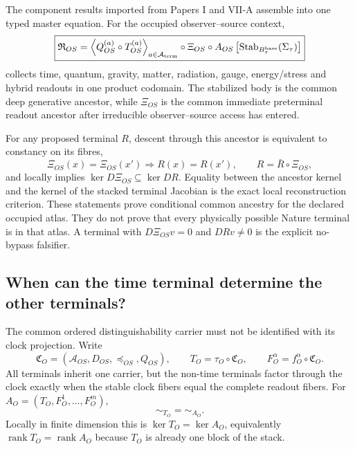 \documentclass[11pt]{article}
\begin{document}
The component results imported from Papers I and VII-A assemble into one
typed master equation.  For the occupied observer--source context,
\begin{equation}
 \boxed{
 \mathfrak R_{OS}
 =
 \left\langle
  Q_{OS}^{(a)}\circ T_{OS}^{(a)}
 \right\rangle_{a\in\mathcal A_{\rm term}}
 \circ\Xi_{OS}\circ A_{OS}
 \left[
  \operatorname{Stab}_{B_\tau^{\rm base}}(\Sigma_\tau)
 \right]}
 \label{eq:synthesis-unified-terminal-atlas}
\end{equation}
collects time, quantum, gravity, matter, radiation, gauge, energy/stress and
hybrid readouts in one product codomain.  The stabilized body is the common
deep generative ancestor, while \(\Xi_{OS}\) is the common immediate
preterminal readout ancestor after irreducible observer--source access has
entered.

For any proposed terminal \(R\), descent through this ancestor is equivalent
to constancy on its fibres,
\begin{equation}
 \Xi_{OS}(x)=\Xi_{OS}(x')\Longrightarrow R(x)=R(x'),
 \qquad
 R=\bar R\circ\Xi_{OS},
 \label{eq:synthesis-ancestor-factorization}
\end{equation}
and locally implies
\(\ker D\Xi_{OS}\subseteq\ker DR\).  Equality between the ancestor kernel and
the kernel of the stacked terminal Jacobian is the exact local reconstruction
criterion.  These statements prove conditional common ancestry for the
declared occupied atlas.  They do not prove that every physically possible
Nature terminal is in that atlas.  A terminal with
\(D\Xi_{OS}v=0\) and \(DRv\neq0\) is the explicit no-bypass falsifier.

\subsection{When can the time terminal determine the other terminals?}

The common ordered distinguishability carrier must not be identified with its
clock projection. Write
\begin{equation}
 \mathfrak C_O=(\mathcal A_{OS},D_{OS},\preceq_{OS},Q_{OS}),
 \qquad
 T_O=\tau_O\circ\mathfrak C_O,
 \qquad
 F_O^\alpha=f_O^\alpha\circ\mathfrak C_O.
 \label{eq:synthesis-carrier-terminal-split}
\end{equation}
All terminals inherit one carrier, but the non-time terminals factor through
the clock exactly when the stable clock fibers equal the complete readout
fibers. For $A_O=(T_O,F_O^1,\ldots,F_O^m)$,
\begin{equation}
 \boxed{\sim_{T_O}=\sim_{A_O}.}
 \label{eq:synthesis-time-sufficiency}
\end{equation}
Locally in finite dimension this is $\ker T_O=\ker A_O$, equivalently
$\operatorname{rank}T_O=\operatorname{rank}A_O$ because $T_O$ is already one
block of the stack.
\end{document}
